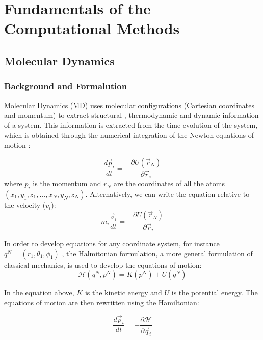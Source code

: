 
\chapter{Fundamentals of the Computational Methods} %

\label{Chapter3} %

\section{Molecular Dynamics}

\subsection{Background and Formalution}
Molecular Dynamics (MD) uses molecular configurations (Cartesian coordinates and momentum) to extract structural , thermodynamic and dynamic information of a system. This information is extracted from the time evolution of the system, which is obtained  through the numerical integration of the Newton equations of motion \cite{tuckerman}:

\begin{equation}
\frac{d \vec{p}_{i}}{dt} = - \frac{\partial U (\vec{r}_{N})}{\partial \vec{r}_{i}}
\end{equation}
where $p_{i}$ is the momentum and $r_{N}$ are the coordinates of all the atoms$(x_{1},y_{1},z_{1},...,x_{N},y_{N},z_{N})$. Alternatively, we can write the equation relative to the velocity ($v_{i}$):
\begin{equation}
m_{i} \frac{\vec{v}_{i}}{dt} = - \frac{\partial U (\vec{r}_{N})}{\partial \vec{r}_{i}}
\end{equation}

In order to develop equations for any coordinate system, for instance $q^{N}=(r_{1},\theta _{1},\phi _{1})$ , the Halmitonian formulation, a more general formulation of classical mechanics,  is used to develop the equations of motion:
\begin{equation}
\mathcal{H} (q^{N},p^{N}) = K(p^{N}) + U(q^{N}) 
\end{equation}

In the equation above, $K$ is the kinetic energy and $U$ is the potential energy. The equations of motion are then rewritten using the Hamiltonian:

\begin{equation}
\frac{d \vec{p}_{i}}{dt} = - \frac{\partial \mathcal{H}}{\partial \vec{q}_{i}}
\end{equation}

